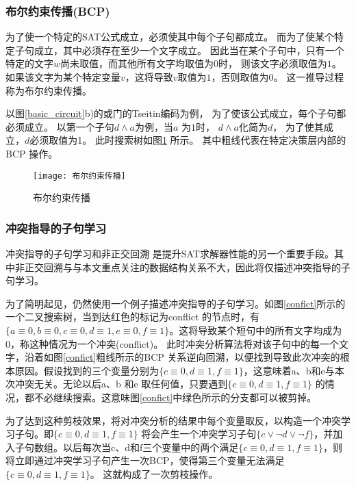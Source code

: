\subsubsection{布尔约束传播(BCP)}
为了使一个特定的SAT公式成立，必须使其中每个子句都成立。
而为了使某个特定子句成立，其中必须存在至少一个文字成立。
因此当在某个子句中，只有一个特定的文字$w$尚未取值，而其他所有文字均取值为$0$时，
则该文字必须取值为$1$。
如果该文字为某个特定变量$v$，这将导致$v$取值为$1$，否则取值为$0$。
这一推导过程称为布尔约束传播。

以图\ref{basic_circuit}b)的或门的Tseitin编码为例，
为了使该公式成立，每个子句都必须成立。
以第一个子句$d \wedge a$为例，当$a$ 为$1$时，
$d \wedge a$化简为$d$，
为了使其成立，$d$必须取值为1。
此时搜索树如图\ref{BCP} 所示。
其中粗线代表在特定决策层内部的BCP 操作。

\begin{figure}[t] %
  \centering
  \texttt{[image: 布尔约束传播]}
  \caption{布尔约束传播}
  \label{BCP}
\end{figure}

\subsubsection{冲突指导的子句学习}
冲突指导的子句学习和非正交回溯 是提升SAT求解器性能的另一个重要手段。其中非正交回溯与与本文重点关注的数据结构关系不大，因此将仅描述冲突指导的子句学习。

为了简明起见，仍然使用一个例子描述冲突指导的子句学习。如图\ref{confict}所示的一个二叉搜索树，当到达红色的标记为conflict 的节点时，有$\{a \equiv 0,b \equiv 0, c \equiv 0,d \equiv1,e \equiv 0,f \equiv1\}$。这将导致某个短句中的所有文字均成为0，称这种情况为一个冲突(conflict)。 此时冲突分析算法将对该子句中的每一个文字，沿着如图\ref{confict}粗线所示的BCP 关系逆向回溯，以便找到导致此次冲突的根本原因。假设找到的三个变量分别为$\{c \equiv 0,d \equiv 1,f \equiv 1\}$，这意味着a、b和e与本次冲突无关。无论以后a、b 和e 取任何值，只要遇到$\{c \equiv 0,d \equiv 1,f \equiv 1\}$ 的情况，都不必继续搜索。这意味图\ref{confict}中绿色所示的分支都可以被剪掉。

为了达到这种剪枝效果，将对冲突分析的结果中每个变量取反，以构造一个冲突学习子句。即$\{c \equiv 0, d \equiv 1, f \equiv 1\}$ 将会产生一个冲突学习子句$\{c\vee \neg d \vee \neg f\}$，并加入子句数组。以后每次当c、d和f三个变量中的两个满足$\{c \equiv 0, d \equiv 1, f \equiv 1\}$，则将立即通过冲突学习子句产生一次BCP，使得第三个变量无法满足$\{c \equiv 0,d \equiv 1,f \equiv 1\}$。 这就构成了一次剪枝操作。

